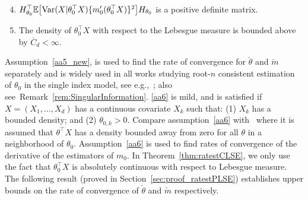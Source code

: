 
\begin{enumerate}[label=\bfseries (A\arabic*)]
\setcounter{enumi}{3}
\item $ H_{\theta_0}^\top\mathbb{E}\big[\mathrm{Var}(X|\theta_0^\top X) \{m_0'(\theta_0^{\top}X)\}^2 \big]H_{\theta_0}$ is a positive definite matrix.
 \label{aa5_new}

\item  \label{aa6} The density of $\theta_0^\top X$ with respect to the Lebesgue measure is bounded above by $\overline{C}_d < \infty$. 

\end{enumerate}
Assumption~\ref{aa5_new}, is used to find the rate of convergence for $\check\theta$ and $\check{m}$ separately and is widely used in all works studying root-$n$ consistent estimation of $\theta_0$ in the single index model, see e.g.,~\cite{Powelletal89,ICHI93,Patra16,2017arXiv171205593B}; also see~Remark~\ref{rem:SingularInformation}. \ref{aa6} is mild, and is satisfied if $X=(X_1,\ldots, X_d)$ has a continuous covariate $X_k$ such that: (1) $X_k$ has a bounded density; and (2) $\theta_{0,k}>0$. Compare assumption~\ref{aa6} with~\citep{ICHI93,cuietal11,2017arXiv171205593B,MR2529970,wang2015spline} where it is assumed that $\theta^\top X$ has a density bounded away from zero for all $\theta$ in a neighborhood of $\theta_0$.
Assumption~\ref{aa6} is used to find rates of convergence of the derivative of the estimators of $m_0$. In Theorem~\ref{thm:ratestCLSE}, we only use the fact that $\theta_0^\top X$ is absolutely continuous with respect to Lebesgue measure. The following result (proved in Section~\ref{sec:proof_ratestPLSE}) establishes upper bounds on the rate of convergence of $\check{\theta}$ and $\check{m}$ respectively.
